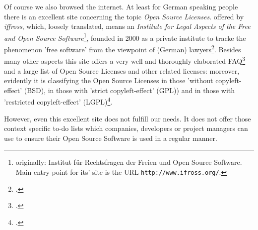 %
%
%
%

%
Of course we also browsed the internet. At least for German speaking people
there is an excellent site concerning the topic \emph{Open Source Licenses}.
offered by \textit{iffross}, which, loosely translated, means an
\textit{Institute for Legal Aspects of the Free and Open Source
Software}\footnote{originally: \glqq{}Institut für Rechtsfragen der Freien und
Open Source Software\grqq{}. Main entry point for its' site is the URL
\texttt{http://www.ifross.org/}.}, founded in 2000 as a private institute to
tracke the phenomenon 'free software' from the viewpoint of (German)
lawyers\footcite[cf.][\nopage wp]{ifross2011b}. Besides many other
aspects this site offers a very well and thoroughly elaborated
FAQ\footcite[cf.][\nopage wp]{ifross2011c} and a large list of Open
Source Licenses and other related licenses: moreover, evidently it is
classifying the Open Source Licenses in those 'without copyleft-effect' (BSD),
in those with 'strict copyleft-effect' (GPL)) and in those with 'restricted
copyleft-effect' (LGPL)\footcite[cf.][\nopage wp]{ifross2011a}.

However, even this excellent site does not fulfill our needs. It does not offer
those context specific to-do lists which companies, developers or project
managers can use to ensure their Open Source Software is used in a regular
manner.

